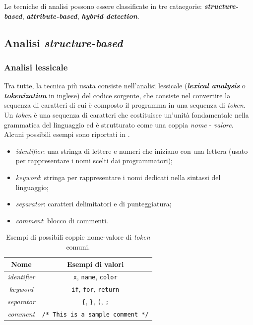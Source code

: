Le tecniche di analisi possono essere classificate in tre cataegorie: \textbf{\textit{structure-based}}, \textbf{\textit{attribute-based}}, \textbf{\textit{hybrid detection}}. 

\subsection{Analisi \textit{structure-based}}

\subsubsection{Analisi lessicale}
Tra tutte, la tecnica più usata consiste nell'analisi lessicale (\textbf{\textit{lexical analysis}} o \textbf{\textit{tokenization}} in inglese) del codice sorgente, che consiste nel convertire la sequenza di caratteri di cui è composto il programma in una sequenza di \textit{token}.
%
Un \textit{token} è una sequenza di caratteri che costituisce un'unità fondamentale nella grammatica del linguaggio ed è strutturato come una coppia \textit{nome} - \textit{valore}.
%
Alcuni possibili esempi sono riportati in .

\begin{itemize}
    \item \textit{identifier}: una stringa di lettere e numeri che iniziano con una lettera (usato per rappresentare i nomi scelti dai programmatori);
    \item \textit{keyword}: stringa per rappresentare i nomi dedicati nella sintassi del linguaggio;
    \item \textit{separator}: caratteri delimitatori e di punteggiatura;
    \item \textit{comment}: blocco di commenti.
\end{itemize}

\begin{table}[h]
    \centering
    \begin{tabular}{|c|c|} 
        \hline
        \textbf{Nome} & \textbf{Esempi di valori} \\ [0.5ex] 
        \hline\hline
        \textit{identifier} & \texttt{x}, \texttt{name}, \texttt{color} \\ 
        \hline
        \textit{keyword} & \texttt{if}, \texttt{for}, \texttt{return} \\
        \hline
        \textit{separator} & \texttt{\{}, \texttt{\}}, \texttt{(}, \texttt{;} \\
        \hline
        \textit{comment} & \texttt{/* This is a sample comment */} \\
        \hline
    \end{tabular}
    \caption{Esempi di possibili coppie nome-valore di \textit{token} comuni.}
    \label{table:token-examples}
\end{table}

